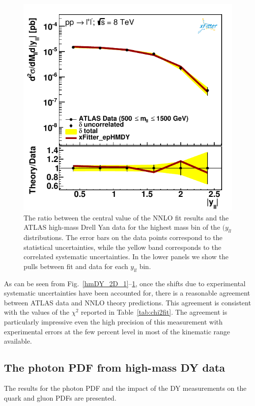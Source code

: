\begin{figure}[t]
\centering
\includegraphics[width=16cm]{figs/data_405-1.pdf}
\caption{The ratio between the central value of the NNLO fit results
  and the ATLAS high-mass Drell Yan data
  for the highest mass bin of the $(y_{ll}$ distributions.
  The error bars on the data points correspond to the statistical
  uncertainties, while the yellow band
  corresponds to the correlated systematic uncertainties.
  In the lower panels we show the pulls between fit and data for each $y_{ll}$
  bin.
}
\label{hmDY_2D_3}
\end{figure}

As can be seen from Fig.~\ref{hmDY_2D_1}--\ref{hmDY_2D_3}, once the shifts due to
experimental systematic uncertainties have been accounted for, there
is a reasonable agreement between ATLAS data and NNLO theory
predictions.
%
This agreement is consistent with the values of the $\chi^2$ reported in
Table~\ref{tab:chi2fit}. The agreement is particularly impressive even 
the high precision of this measurement with experimental
errors at the few percent level in most of the kinematic range
available.


\subsection{The photon PDF from high-mass DY data}
%
The results for the photon PDF and the impact
of the DY measurements on the quark and gluon PDFs are presented.
%


